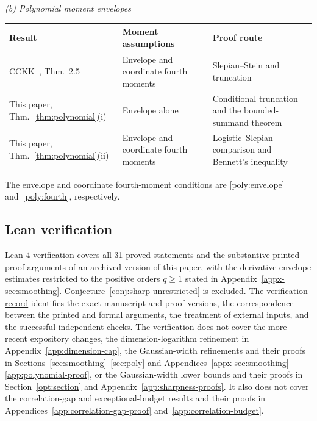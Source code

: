 \documentclass[11pt,letterpaper]{article}
\newcommand{\vSix}[1]{{\color{magenta}#1}}
\theoremstyle{remark}
\begin{document}
\begin{table}[!htb]
\medskip
\textit{(b) Polynomial moment envelopes}\par\smallskip
\begin{tabularx}{\textwidth}{@{}>{\raggedright\arraybackslash}p{}
 >{\raggedright\arraybackslash}p{}
 >{\raggedright\arraybackslash}X@{}}
\toprule
Result & Moment assumptions & Proof route \\
\midrule
CCKK~\cite{CCKK2022}, Thm.~2.5 & Envelope and coordinate fourth moments & Slepian--Stein and truncation \\[2pt]
This paper, Thm.~\ref{thm:polynomial}(i) & Envelope alone & Conditional truncation and the bounded-summand theorem \\[2pt]
This paper, Thm.~\ref{thm:polynomial}(ii) & Envelope and coordinate fourth moments & Logistic--Slepian comparison and Bennett's inequality \\
\bottomrule
\end{tabularx}
\smallskip
{\footnotesize\raggedright
The envelope and coordinate fourth-moment conditions are
\eqref{poly:envelope} and~\eqref{poly:fourth}, respectively.\par}
\end{table}

\subsection{Lean verification}\label{sec:lean-introduction}
{Lean 4 verification covers all 31 proved statements and the substantive
printed-proof arguments of an archived version of this paper, with the
derivative-envelope estimates restricted to the positive orders
\(q\ge1\) stated in Appendix~\ref{appx-sec:smoothing}.
Conjecture~\ref{conj:sharp-unrestricted} is excluded. The
\href{https://github.com/VC2015/HDCLTs/blob/0ef13b938895535fe2dcc135b9400688ed97fa61/lean-rectangle-clt-singular/split-v4-certification/printed-proof-extension/README.md}{verification record}
identifies the exact manuscript and proof versions, the correspondence
between the printed and formal arguments, the treatment of external
inputs, and the successful independent checks. The verification does not
\vSix{cover the more recent expository changes, the dimension-logarithm
refinement in Appendix~\ref{app:dimension-cap}, the Gaussian-width
refinements and their proofs in Sections~\ref{sec:smoothing}--\ref{sec:poly}
and Appendices~\ref{appx-sec:smoothing}--\ref{app:polynomial-proof}, or
the Gaussian-width lower bounds and their proofs in
Section~\ref{opt:section} and Appendix~\ref{app:sharpness-proofs}.}
It also does not cover the correlation-gap and exceptional-budget
results and their proofs in Appendices~\ref{app:correlation-gap-proof}
and~\ref{app:correlation-budget}.}
\end{document}
